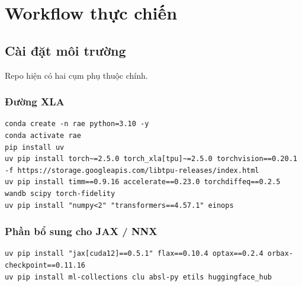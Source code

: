 \section{Workflow thực chiến}

\subsection{Cài đặt môi trường}

Repo hiện có hai cụm phụ thuộc chính.

\subsubsection{Đường XLA}

\begin{lstlisting}[style=rae]
conda create -n rae python=3.10 -y
conda activate rae
pip install uv
uv pip install torch~=2.5.0 torch_xla[tpu]~=2.5.0 torchvision==0.20.1 -f https://storage.googleapis.com/libtpu-releases/index.html
uv pip install timm==0.9.16 accelerate==0.23.0 torchdiffeq==0.2.5 wandb scipy torch-fidelity
uv pip install "numpy<2" "transformers==4.57.1" einops
\end{lstlisting}

\subsubsection{Phần bổ sung cho JAX / NNX}

\begin{lstlisting}[style=rae]
uv pip install "jax[cuda12]==0.5.1" flax==0.10.4 optax==0.2.4 orbax-checkpoint==0.11.16
uv pip install ml-collections clu absl-py etils huggingface_hub
\end{lstlisting}


